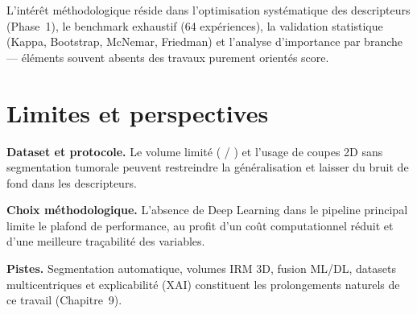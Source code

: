 L'intérêt méthodologique réside dans l'optimisation systématique des descripteurs (Phase~1),
le benchmark exhaustif (64 expériences), la validation statistique (Kappa, Bootstrap, McNemar,
Friedman) et l'analyse d'importance par branche --- éléments souvent absents des travaux
purement orientés score.

\section{Limites et perspectives}

\textbf{Dataset et protocole.} Le volume limité (\NTrain{} / \NTest{}) et l'usage de coupes
2D sans segmentation tumorale peuvent restreindre la généralisation et laisser du bruit de
fond dans les descripteurs.

\textbf{Choix méthodologique.} L'absence de Deep Learning dans le pipeline principal limite le
plafond de performance, au profit d'un coût computationnel réduit et d'une meilleure
traçabilité des variables.

\textbf{Pistes.} Segmentation automatique, volumes IRM 3D, fusion ML/DL, datasets
multicentriques et explicabilité (XAI) constituent les prolongements naturels de ce travail
(Chapitre~9).
